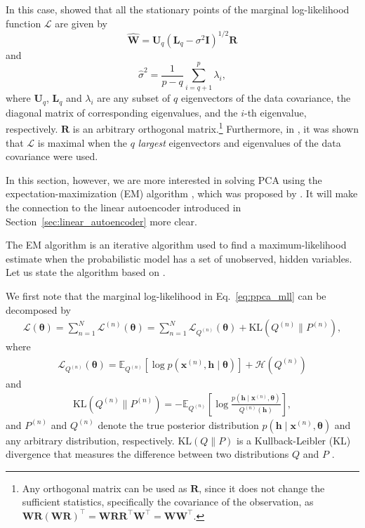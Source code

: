 \documentclass[dissertation,nocontribution]{aaltoseries}
\newcommand{\vect}[1]{\mathbf{#1}}
\newcommand{\vects}[1]{\boldsymbol{#1}}
\newcommand{\matr}[1]{\mathbf{#1}}
\newcommand{\vh}[0]{\vect{h}}
\newcommand{\vx}[0]{\vect{x}}
\newcommand{\mW}[0]{\matr{W}}
\newcommand{\mU}[0]{\matr{U}}
\newcommand{\mR}[0]{\matr{R}}
\newcommand{\mI}{\matr{I}}
\newcommand{\mL}{\matr{L}}
\newcommand{\TT}[0]{{\vects{\theta}}}
\newcommand{\LL}[0]{\mathcal{L}}
\newcommand{\HH}[0]{\mathcal{H}}
\newcommand{\KL}[0]{\text{KL}}
\newcommand{\E}[0]{\mathbb{E}}
\begin{document}
In this case, \citet{Tipping1999} showed that all the 
stationary points of the marginal log-likelihood function
$\LL$ are given by
\[
\hat{\mW} = \mU_q \left( \mL_q - \sigma^2 \mI \right)^{1/2}
\mR
\]
and
\[
\hat{\sigma}^2 = \frac{1}{p - q} \sum_{i=q+1}^p \lambda_i,
\]
where $\mU_q$, $\mL_q$ and $\lambda_i$ are any subset of
$q$ eigenvectors of the data covariance, the diagonal matrix
of corresponding eigenvalues, and the $i$-th eigenvalue,
respectively. $\mR$ is an arbitrary orthogonal
matrix.\footnote{
Any orthogonal matrix can be used as $\mR$, since it does
not change the sufficient statistics, specifically the
covariance of the observation, as $\mW\mR\left( \mW\mR\right)^\top
= \mW\mR \mR^\top \mW^\top = \mW\mW^\top$.
}
Furthermore, in \citep{Tipping1999}, it was shown that $\LL$
is maximal when the $q$ \textit{largest} eigenvectors and
eigenvalues of the data covariance were used.

In this section, however, we are more interested in solving PCA
using the expectation-maximization
(EM) algorithm
\citep{Dempster1977}, which was proposed by \citet{Roweis1998}.
It will make the connection to the linear autoencoder introduced
in Section~\ref{sec:linear_autoencoder} more clear.

The EM algorithm is an iterative algorithm used to find a
maximum-likelihood estimate when the probabilistic model
has a set of unobserved, hidden variables. Let us state the
algorithm based on \citep{Neal1999,Bishop2006}.

We first note that the marginal log-likelihood in
Eq.~\eqref{eq:ppca_mll} can be decomposed by
\begin{align}
    \label{eq:mll_decom}
    \LL(\TT) = \sum_{n=1}^N \LL^{(n)}(\TT) = \sum_{n=1}^N
    \LL_{Q^{(n)}}(\TT) + \KL(Q^{(n)} \| P^{(n)}),
\end{align}
where
\begin{align}
    \label{eq:mll_post}
    \LL_{Q^{(n)}}(\TT) = \E_{Q^{(n)}} \left[ \log
    p(\vx^{(n)}, \vh \mid
    \TT)\right] + \HH(Q^{(n)})
\end{align}
and
\begin{align}
    \label{eq:kldiv}
    \KL(Q^{(n)} \| P^{(n)}) = -\E_{Q^{(n)}} \left[ \log
    \frac{p(\vh \mid \vx^{(n)},
    \TT)}{Q^{(n)}(\vh)} \right],
\end{align}
and $P^{(n)}$ and $Q^{(n)}$ denote the true posterior distribution
$p(\vh \mid \vx^{(n)}, \TT)$ and any arbitrary distribution,
respectively. $\KL(Q \| P)$ is a Kullback-Leibler
(KL)
divergence that measures the difference between two
distributions $Q$ and $P$ \citep{Kullback1951}.
\end{document}
